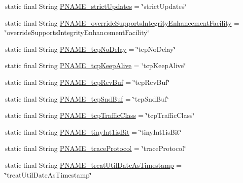 \begin{DoxyCompactItemize}
\item 
static final String \mbox{\hyperlink{classcom_1_1mysql_1_1cj_1_1conf_1_1_property_definitions_af33911aaf8321e862198f5e76b6ee1cc}{P\+N\+A\+M\+E\+\_\+strict\+Updates}} = \char`\"{}strict\+Updates\char`\"{}
\item 
static final String \mbox{\hyperlink{classcom_1_1mysql_1_1cj_1_1conf_1_1_property_definitions_a9e7a5e5eac89335ca6007b3c66ba8a99}{P\+N\+A\+M\+E\+\_\+override\+Supports\+Integrity\+Enhancement\+Facility}} = \char`\"{}override\+Supports\+Integrity\+Enhancement\+Facility\char`\"{}
\item 
static final String \mbox{\hyperlink{classcom_1_1mysql_1_1cj_1_1conf_1_1_property_definitions_a56a3f147f16134d1b1e5aeb64906a190}{P\+N\+A\+M\+E\+\_\+tcp\+No\+Delay}} = \char`\"{}tcp\+No\+Delay\char`\"{}
\item 
static final String \mbox{\hyperlink{classcom_1_1mysql_1_1cj_1_1conf_1_1_property_definitions_a1661006f0ad0cd16fda0f78670ba367d}{P\+N\+A\+M\+E\+\_\+tcp\+Keep\+Alive}} = \char`\"{}tcp\+Keep\+Alive\char`\"{}
\item 
static final String \mbox{\hyperlink{classcom_1_1mysql_1_1cj_1_1conf_1_1_property_definitions_abadf694ebfd5804d80d3f8ef44e5c278}{P\+N\+A\+M\+E\+\_\+tcp\+Rcv\+Buf}} = \char`\"{}tcp\+Rcv\+Buf\char`\"{}
\item 
static final String \mbox{\hyperlink{classcom_1_1mysql_1_1cj_1_1conf_1_1_property_definitions_a30f856339e5fa77969afba1ce6333784}{P\+N\+A\+M\+E\+\_\+tcp\+Snd\+Buf}} = \char`\"{}tcp\+Snd\+Buf\char`\"{}
\item 
static final String \mbox{\hyperlink{classcom_1_1mysql_1_1cj_1_1conf_1_1_property_definitions_a59517f9c685eca3ad51edbd532bf8a40}{P\+N\+A\+M\+E\+\_\+tcp\+Traffic\+Class}} = \char`\"{}tcp\+Traffic\+Class\char`\"{}
\item 
static final String \mbox{\hyperlink{classcom_1_1mysql_1_1cj_1_1conf_1_1_property_definitions_ad068542f47359d5c0fddf70db3ff528f}{P\+N\+A\+M\+E\+\_\+tiny\+Int1is\+Bit}} = \char`\"{}tiny\+Int1is\+Bit\char`\"{}
\item 
static final String \mbox{\hyperlink{classcom_1_1mysql_1_1cj_1_1conf_1_1_property_definitions_a1704bc5682ef0147e87107a213516051}{P\+N\+A\+M\+E\+\_\+trace\+Protocol}} = \char`\"{}trace\+Protocol\char`\"{}
\item 
static final String \mbox{\hyperlink{classcom_1_1mysql_1_1cj_1_1conf_1_1_property_definitions_a60b5d5ba115beddc9cc7c0c4b19b532e}{P\+N\+A\+M\+E\+\_\+treat\+Util\+Date\+As\+Timestamp}} = \char`\"{}treat\+Util\+Date\+As\+Timestamp\char`\"{}

\end{DoxyCompactItemize}
